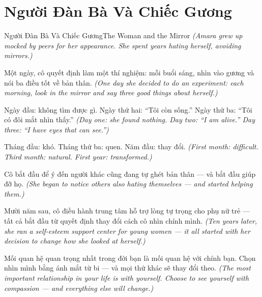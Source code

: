 \section{Người Đàn Bà Và Chiếc Gương}
\begin{truyen}{Người Đàn Bà Và Chiếc Gương}{The Woman and the Mirror}
\textit{(Amara grew up mocked by peers for her appearance. She spent years hating herself, avoiding mirrors.)}

Một ngày, cô quyết định làm một thí nghiệm: mỗi buổi sáng, nhìn vào gương và nói ba điều tốt về bản thân.
\textit{(One day she decided to do an experiment: each morning, look in the mirror and say three good things about herself.)}

Ngày đầu: không tìm được gì. Ngày thứ hai: ``Tôi còn sống.'' Ngày thứ ba: ``Tôi có đôi mắt nhìn thấy.''
\textit{(Day one: she found nothing. Day two: ``I am alive.'' Day three: ``I have eyes that can see.'')}

Tháng đầu: khó. Tháng thứ ba: quen. Năm đầu: thay đổi.
\textit{(First month: difficult. Third month: natural. First year: transformed.)}

Cô bắt đầu để ý đến người khác cũng đang tự ghét bản thân — và bắt đầu giúp đỡ họ.
\textit{(She began to notice others also hating themselves — and started helping them.)}

Mười năm sau, cô điều hành trung tâm hỗ trợ lòng tự trọng cho phụ nữ trẻ — tất cả bắt đầu từ quyết định thay đổi cách cô nhìn chính mình.
\textit{(Ten years later, she ran a self-esteem support center for young women — it all started with her decision to change how she looked at herself.)}

\end{truyen}

\begin{baihoc}
Mối quan hệ quan trọng nhất trong đời bạn là mối quan hệ với chính bạn. Chọn nhìn mình bằng ánh mắt từ bi — và mọi thứ khác sẽ thay đổi theo.
\textit{(The most important relationship in your life is with yourself. Choose to see yourself with compassion — and everything else will change.)}
\end{baihoc}
\ngancach

